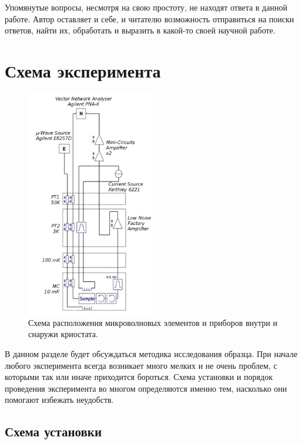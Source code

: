 \documentclass[12pt, twoside]{report}
\numberwithin{equation}{section}
\numberwithin{figure}{section}
\begin{document}
Упомянутые вопросы, несмотря на свою простоту, не находят ответа в данной работе. Автор оставляет и себе, и читателю возможность отправиться на поиски ответов, найти их, обработать и выразить в какой-то своей научной работе.


\section{Схема эксперимента}  \label{sec:exp_scheme}

\begin{figure}
\begingroup
\captionsetup{justification=normal, width=0.45\textwidth}
\centering
\includegraphics[width=0.5\textwidth]{Pictures/crio_scheme2}
\caption{Схема расположения микроволновых элементов и приборов внутри и снаружи криостата.}
\label{fig:cryo_scheme}
\endgroup
\end{figure}


В данном разделе будет обсуждаться методика исследования образца. При начале любого эксперимента всегда возникает много мелких и не очень проблем, с которыми так или иначе приходится бороться. Схема установки и порядок проведения эксперимента во многом определяются именно тем, насколько они помогают избежать неудобств.

\subsection{Схема установки}
\end{document}
